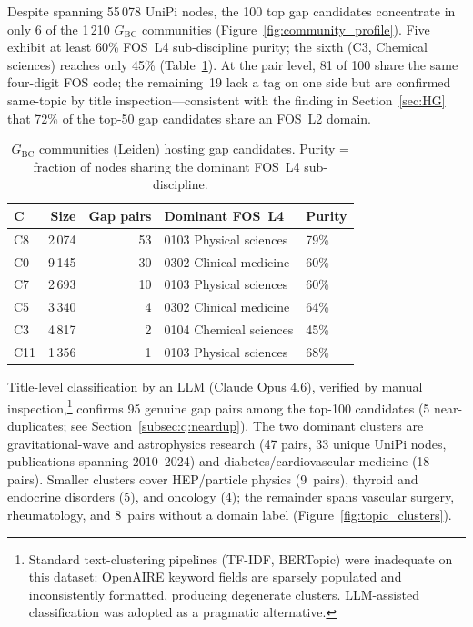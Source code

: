 Despite spanning 55\,078 UniPi nodes, the 100 top gap candidates
concentrate in only 6 of the 1\,210 $G_\text{BC}$ communities
(Figure~\ref{fig:community_profile}).  Five exhibit at least 60\%
FOS~L4 sub-discipline purity; the sixth (C3, Chemical sciences)
reaches only 45\% (Table~\ref{tab:comms}).  At the pair level, 81 of
100 share the same four-digit FOS code; the remaining~19 lack a tag on
one side but are confirmed same-topic by title
inspection---consistent with the finding in Section~\ref{sec:HG} that
72\% of the top-50 gap candidates share an FOS~L2 domain.

\begin{table}[h]
\centering
\small
\begin{tabular}{lrrll}
\toprule
C & Size & Gap pairs & Dominant FOS~L4 & Purity \\
\midrule
C8  & 2\,074 & 53 & 0103 Physical sciences  & 79\% \\
C0  & 9\,145 & 30 & 0302 Clinical medicine  & 60\% \\
C7  & 2\,693 & 10 & 0103 Physical sciences  & 60\% \\
C5  & 3\,340 &  4 & 0302 Clinical medicine  & 64\% \\
C3  & 4\,817 &  2 & 0104 Chemical sciences  & 45\% \\
C11 & 1\,356 &  1 & 0103 Physical sciences  & 68\% \\
\bottomrule
\end{tabular}
\caption{$G_\text{BC}$ communities (Leiden) hosting gap candidates.
Purity = fraction of nodes sharing the dominant FOS~L4 sub-discipline.}
\label{tab:comms}
\end{table}

Title-level classification by an LLM (Claude Opus 4.6), verified by
manual inspection,\footnote{Standard text-clustering pipelines
(TF-IDF, BERTopic) were inadequate on this dataset: OpenAIRE keyword
fields are sparsely populated and inconsistently formatted, producing
degenerate clusters.  LLM-assisted classification was adopted as a
pragmatic alternative.} confirms 95 genuine gap pairs among the
top-100 candidates (5 near-duplicates; see
Section~\ref{subsec:q:neardup}).  The two dominant clusters are
gravitational-wave and astrophysics research (47 pairs, 33 unique
UniPi nodes, publications spanning 2010--2024) and
diabetes/cardiovascular medicine (18 pairs).  Smaller clusters cover
HEP/particle physics (9~pairs), thyroid and endocrine disorders (5),
and oncology (4); the remainder spans vascular surgery, rheumatology,
and 8~pairs without a domain label (Figure~\ref{fig:topic_clusters}).

